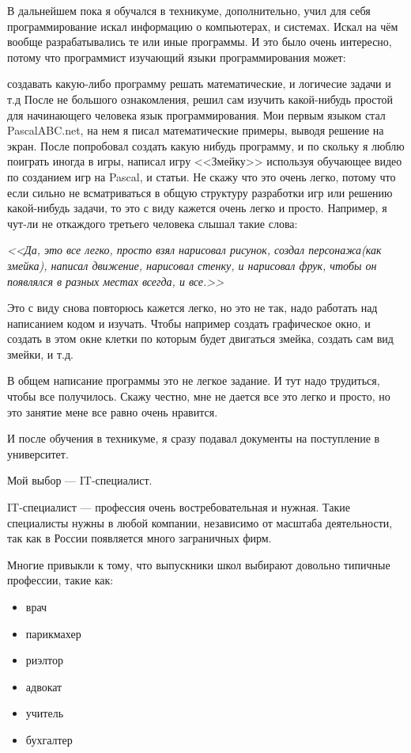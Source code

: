 \documentclass[14pt,a4paper,oneside]{extbook}
\begin{document}
		В дальнейшем пока я обучался в техникуме, дополнительно, учил для себя программирование искал информацию о компьютерах, и системах. Искал на чём вообще разрабатывались те или иные программы. И это было очень интересно, потому что программист изучающий языки программирования может:
		
		создавать какую-либо программу
		решать математические, и логичесие задачи
		и т.д
		После не большого ознакомления, решил сам изучить какой-нибудь простой для начинающего человека язык программирования. Мои первым языком стал PascalABC.net, на нем я писал математические примеры, выводя решение на экран. После попробовал создать какую нибудь программу, и по скольку я люблю поиграть иногда в игры, написал игру <<Змейку>> используя обучающее видео по созданием игр на Pascal, и статьи. Не скажу что это очень легко, потому что если сильно не всматриваться в общую структуру разработки игр или решению какой-нибудь задачи, то это с виду кажется очень легко и просто.
		Например, я чут-ли не откаждого третьего человека слышал такие слова:
		
		\textit{<<Да, это все легко, просто взял нарисовал рисунок, создал персонажа(как змейка), написал движение, нарисовал стенку, и нарисовал фрук, чтобы он появлялся в разных местах всегда, и все.>>}
		
		Это с виду снова повторюсь кажется легко, но это не так, надо работать над написанием кодом и изучать. Чтобы например создать графическое окно, и создать в этом окне клетки по которым будет двигаться змейка, создать сам вид змейки, и т.д.
		
		В общем написание программы это не легкое задание. И тут надо трудиться, чтобы все получилось. Скажу честно, мне не дается все это легко и просто, но это занятие мене все равно очень нравится.
		
		И после обучения в техникуме, я сразу подавал документы на поступление в университет.
		
		Мой выбор --- IT-специалист.
		
		IT-специалист --- профессия очень востребовательная и нужная. Такие специалисты нужны в любой компании, независимо от масштаба деятельности, так как в России появляется много заграничных фирм.
		
		Многие привыкли к тому, что выпускники школ выбирают довольно типичные профессии, такие как:
		
		\begin{itemize}
			\item врач
			\item парикмахер
			\item риэлтор
			\item адвокат
			\item учитель
			\item бухгалтер
		\end{itemize}
		
\end{document}
